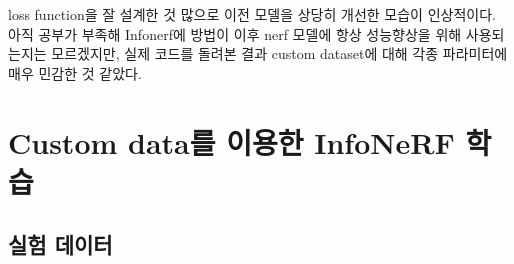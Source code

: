 \documentclass{vipweekly}
\begin{document}
loss function을 잘 설계한 것 많으로 이전 모델을 상당히 개선한 모습이 인상적이다. 
아직 공부가 부족해 Infonerf에 방법이 이후 nerf 모델에 항상 성능향상을 위해 사용되는지는 모르겠지만, 실제 코드를 돌려본 결과 custom dataset에 대해 각종 파라미터에 매우 민감한 것 같았다.

\newpage

\section{Custom data를 이용한 InfoNeRF 학습}

\subsection{실험 데이터} 


\begin{figure}[h]
    \centering

    \hfill\\

    \hfill
    \hfill
    \hfill


\end{figure}
\end{document}
